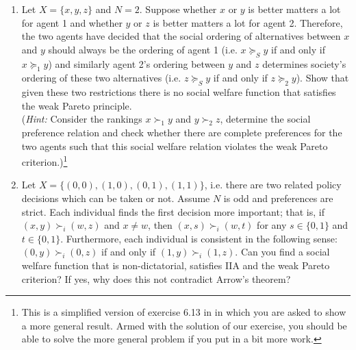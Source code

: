 \documentclass[a4paper,12pt]{article}
\begin{document}
\begin{enumerate}
\item Let $X=\{x,y,z\}$ and $N=2$. Suppose whether $x$ or $y$ is better matters a lot for agent 1 and whether $y$ or $z$ is better matters a lot for agent 2. Therefore, the two agents have decided that the social ordering of alternatives between $x$ and $y$ should always be the ordering of agent 1 (i.e. $x\succeq_S y$ if and only if $x\succeq_1 y$) and similarly agent 2's ordering between $y$ and $z$ determines society's ordering of these two alternatives (i.e. $z\succeq_S y$ if and only if $z\succeq_2 y$). Show that given these two restrictions there is no social welfare function that satisfies the weak Pareto principle.\\(\emph{Hint: }Consider the rankings $x\succ_1 y$ and $y\succ_2 z$, determine the social preference relation and check whether there are complete preferences for the two agents such that this social welfare relation violates the weak Pareto criterion.)\footnote{This is a simplified version of exercise 6.13 in \cite{jehle2001advanced} in which you are asked to show a more general result. Armed with the solution of our exercise, you should be able to solve the more general problem if you put in a bit more work.}
\item Let $X=\{(0,0),(1,0),(0,1),(1,1)\}$, i.e. there are two related policy decisions which can be taken or not. Assume $N$ is odd and preferences are strict. Each individual finds the first decision more important; that is, if $(x,y)\succ_i (w,z)$ and $x\neq w$, then $(x,s)\succ_i (w,t)$ for any $s\in\{0,1\}$ and $t\in\{0,1\}$. Furthermore, each individual is consistent in the following sense:  $(0,y)\succ_i (0,z)$ if and only if $(1,y)\succ_i (1,z)$. Can you find a social welfare function that is non-dictatorial, satisfies IIA and the weak Pareto criterion? If yes, why does this not contradict Arrow's theorem?

\end{enumerate}
\end{document}
